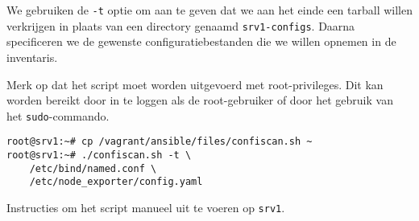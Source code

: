 We gebruiken de \texttt{-t} optie om aan te geven dat we aan het einde een tarball willen verkrijgen in plaats van een directory genaamd \texttt{srv1-configs}.
Daarna specificeren we de gewenste configuratiebestanden die we willen opnemen in de inventaris.

Merk op dat het script moet worden uitgevoerd met root-privileges.
Dit kan worden bereikt door in te loggen als de root-gebruiker of door het gebruik van het \texttt{sudo}-commando.

\begin{listing}
  \begin{verbatim}
root@srv1:~# cp /vagrant/ansible/files/confiscan.sh ~
root@srv1:~# ./confiscan.sh -t \
    /etc/bind/named.conf \
    /etc/node_exporter/config.yaml
  \end{verbatim}
  \caption{Instructies om het script manueel uit te voeren op \texttt{srv1}.}
  \label{lst:bijlage-run-script-manual}
\end{listing}
